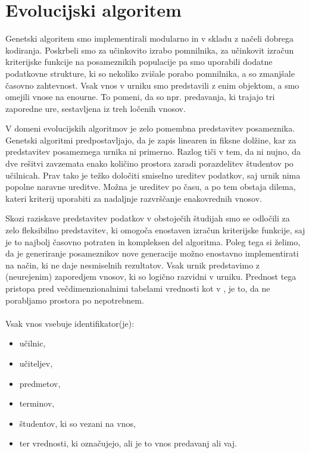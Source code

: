 \documentclass[a4paper,12pt]{book}
\begin{document}
\section{Evolucijski algoritem}
Genetski algoritem smo implementirali modularno in v skladu z načeli dobrega kodiranja. Poskrbeli smo za učinkovito izrabo pomnilnika, za učinkovit izračun kriterijske funkcije na posameznikih populacije pa smo uporabili dodatne podatkovne strukture, ki so nekoliko zvišale porabo pomnilnika, a so zmanjšale časovno zahtevnost. Vsak vnos v urniku smo predstavili z enim objektom, a smo omejili vnose na enourne. To pomeni, da so npr. predavanja, ki trajajo tri zaporedne ure, sestavljena iz treh ločenih vnosov. 

V domeni evolucijskih algoritmov je zelo pomembna predstavitev posameznika. Genetski algoritmi predpostavljajo, da je zapis linearen in fiksne dolžine, kar za predstavitev posameznega urnika ni primerno. Razlog tiči v tem, da  ni nujno, da dve rešitvi zavzemata enako količino prostora zaradi porazdelitev študentov po učilnicah. Prav tako je težko določiti smiselno ureditev podatkov, saj urnik nima popolne naravne ureditve. Možna je ureditev po času, a po tem obstaja dilema, kateri kriterij uporabiti za nadaljnje razvrščanje enakovrednih vnosov. 

Skozi raziskave predstavitev podatkov v obstoječih študijah \cite{sigl2003solving,abramson1991parallel,colorni1992genetic} smo se odločili za zelo fleksibilno predstavitev, ki omogoča enostaven izračun kriterijske funkcije, saj je to najbolj časovno potraten in kompleksen del algoritma. Poleg tega si želimo, da je generiranje posameznikov nove generacije možno enostavno implementirati na način, ki ne daje nesmiselnih rezultatov. Vsak urnik predstavimo z (neurejenim) zaporedjem vnosov, ki so logično razvidni v urniku. Prednost tega pristopa pred večdimenzionalnimi tabelami vrednosti kot v \cite{sigl2003solving}, je to, da ne porabljamo prostora po nepotrebnem. 
\\
\\
Vsak vnos vsebuje identifikator(je): 
\begin{itemize}
\item učilnic, 
\item učiteljev, 
\item predmetov, 
\item terminov, 
\item študentov, ki so vezani na vnos,
\item ter vrednosti, ki označujejo, ali je to vnos predavanj ali vaj.
\end{itemize}
\end{document}
